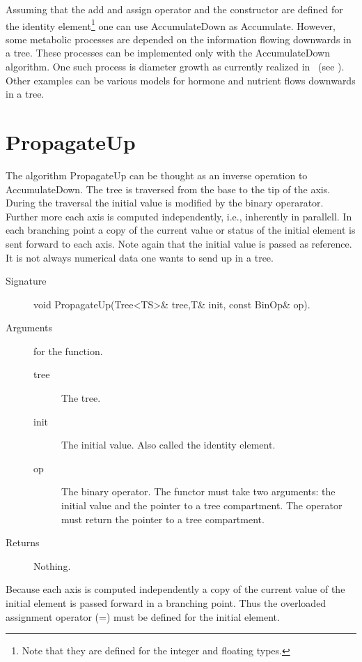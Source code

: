 Assuming  that the  add and  assign operator  and the  constructor are
defined for  the identity element\footnote{Note that  they are defined
for the  integer and  floating types.} one  can use  AccumulateDown as
Accumulate.   However, some  metabolic processes  are depended  on the
information  flowing downwards  in  a tree.   These  processes can  be
implemented only with the  AccumulateDown algorithm.  One such process
is   diameter  growth   as   currently  realized   in  \lignum\   (see
\cite{perttunen:aob96}).  Other  examples can  be  various models  for
hormone and nutrient flows downwards in a tree.

\section{PropagateUp}

The algorithm PropagateUp  can be thought as  an inverse  operation to
AccumulateDown. The tree is traversed from the  base to the tip of the
axis. During the traversal the initial value is modified by the binary
operarator. Further  more each axis  is computed  independently, i.e.,
inherently in parallell. In each branching point a copy of the current
value or status of the  initial element is  sent forward to each axis.
Note again  that the initial value  is passed as  reference. It is not
always numerical data one wants to send up in a tree.

\begin{description}
   \item [Signature] void PropagateUp(Tree<TS>\& tree,T\& init, const BinOp\& op).
   \item [Arguments] for the function.
     \begin{description}
        \item [tree] The tree.
        \item [init] The initial value. Also called the identity
     element.
        \item [op] The binary operator. The functor must take two
     arguments: the initial value and the pointer to a tree compartment. The
     operator must return the pointer to a tree compartment.
     \end{description} 
   \item[Returns] Nothing.
\end{description} 
 
Because  each  axis is computed   independently a copy of  the current
value  of  the initial  element   is  passed forward   in a  branching
point. Thus the overloaded assignment operator (=) must be defined for
the initial element.

